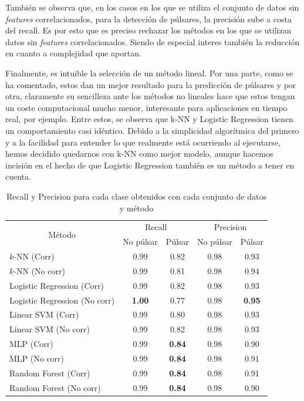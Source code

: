 \documentclass[a4paper]{article} %
\begin{document}
También se observa que, en los casos en los que se utiliza el conjunto de datos sin \textit{features} correlacionados, para la detección de púlsares, la precisión sube a costa del recall. Es por esto que es preciso rechazar los métodos en los que se utilizan datos sin \textit{features} correlacionados. Siendo de especial interes también la reducción en cuanto a complejidad que aportan.\vspace{5mm}

Finalmente, es intuible la selección de un método lineal. Por una parte, como se ha comentado, estos dan un mejor resultado para la predicción de púlsares y por otra, claramente su sencilleza ante los métodos no lineales hace que estos tengan un coste computacional mucho menor, interesante para aplicaciones en tiempo real, por ejemplo. Entre estos, se observa que k-NN y Logistic Regression tienen un comportamiento casi idéntico. Debido a la simplicidad algorítmica del primero y a la facilidad para entender lo que realmente está ocurriendo al ejecutarse, hemos decidido quedarnos con k-NN como mejor modelo, aunque hacemos incisión en el hecho de que Logistic Regression también es un método a tener en cuenta.
\begin{table}[H]
\centering
\begin{tabular}{lcccc}
\hline
\multicolumn{1}{c}{\multirow{2}{*}{Método}} & \multicolumn{2}{c}{Recall} & \multicolumn{2}{c}{Precision} \\ \cline{2-5} 
\multicolumn{1}{c}{} & No púlsar & Púlsar & No púlsar & Púlsar \\ \hline
$k$-NN (Corr) & 0.99 & 0.82 & 0.98 & 0.93 \\
$k$-NN (No corr) & 0.99 & 0.81 & 0.98 & 0.94 \\
Logistic Regression (Corr) & 0.99 & 0.82 & 0.98 & 0.93 \\
Logistic Regression (No corr) & \textbf{1.00} & 0.77 & 0.98 & \textbf{0.95} \\
Linear SVM (Corr) & 0.99 & 0.80 & 0.98 & 0.93 \\
Linear SVM (No corr) & 0.99 & 0.82 & 0.98 & 0.93 \\
MLP (Corr) & 0.99 & \textbf{0.84} & 0.98 & 0.90 \\
MLP (No corr) & 0.99 & \textbf{0.84} & 0.98 & 0.91 \\
Random Forest (Corr) & 0.99 & \textbf{0.84} & 0.98 & 0.91 \\
Random Forest (No corr) & 0.99 & \textbf{0.84} & 0.98 & 0.90 \\ \hline
\end{tabular}
\caption{Recall y Precision para cada clase obtenidos con cada conjunto de datos y método}
\label{RecallPrecisionCompareTable}
\end{table}
\end{document}
